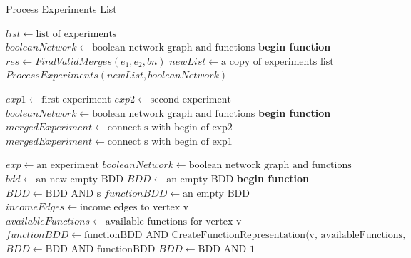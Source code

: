 \documentclass{article}      %
\newcounter{ct}
\begin{document}
\pagebreak

\begin{algorithm} \caption{Process Experiments List}
\begin{algorithmic}[1]
\State $list \gets \text{list of experiments}$
\State $booleanNetwork \gets \text{boolean network graph and functions}$
\State \textbf{begin function}
        \State $res \gets FindValidMerges(e_1, e_2, bn)$
        \State $newList \gets \text{a copy of experiments list}$
        \State {}
        \State {} $ProcessExperiments(newList, booleanNetwork)$
    \EndFor
\EndFunction
\State {}
\end{algorithmic}
\end{algorithm}
\begin{algorithm}
\begin{algorithmic}[1]
\State $exp1 \gets \text{first experiment}$
\State $exp2 \gets \text{second experiment}$
\State $booleanNetwork \gets \text{boolean network graph and functions}$
\State \textbf{begin function}
        \State $mergedExperiment \gets \text{connect s with begin of exp2}$
                \State {}
        \EndIf
    \EndFor
        \State $mergedExperiment \gets \text{connect s with begin of exp1}$
                \State {}
        \EndIf
    \EndFor
\EndFunction
\end{algorithmic}
\end{algorithm}
\begin{algorithm}
\begin{algorithmic}[1]
\State $exp \gets \text{an experiment}$
\State $booleanNetwork \gets \text{boolean network graph and functions}$
\State $bdd \gets \text{an new empty BDD}$
\State {}
\State $BDD \gets \text{an empty BDD}$
\State \textbf{begin function}
        \State $BDD \gets \text {BDD AND s}$
    \EndFor
\State $functionBDD \gets \text{an empty BDD}$
        \State $incomeEdges \gets \text{income edges to vertex v}$
        \State $availableFunctions \gets \text{available functions for vertex v}$
        \State $functionBDD \gets \text{functionBDD AND CreateFunctionRepresentation(v, availableFunctions, incomeEdges, experiment.length)}$
    \EndFor
\State $BDD \gets \text{BDD AND functionBDD}$
\State $BDD \gets \text{BDD AND 1}$
    \State {}
\EndIf
    \State {}
\EndFunction
\end{algorithmic}
\end{algorithm}
\end{document}
